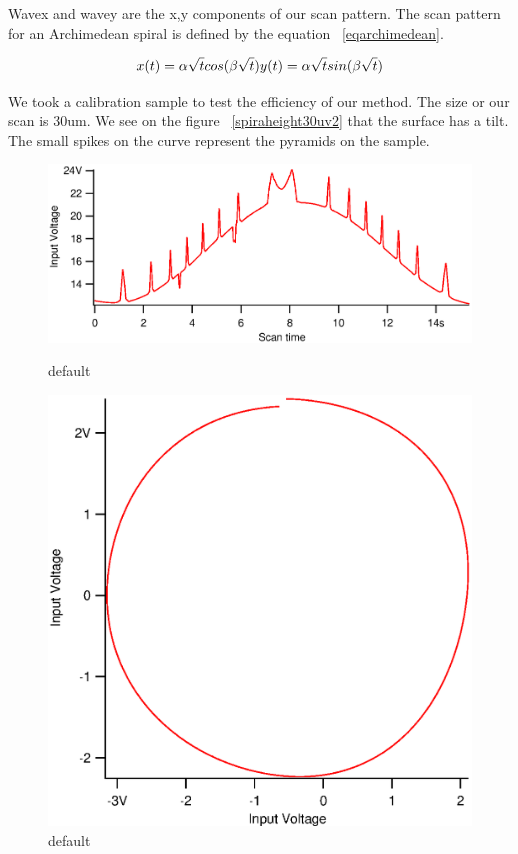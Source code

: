 Wavex and wavey are the x,y components of our scan pattern. The scan pattern for an Archimedean spiral is defined by the equation  ~\ref{eqarchimedean}.

\begin{equation}\label{eqarchimedean}
x(t)= \alpha \sqrt{t} cos(\beta \sqrt{t})\\
y(t)= \alpha \sqrt{t} sin(\beta \sqrt{t})
\end{equation}

We took a calibration sample to test the efficiency of our method. The size or our scan is 30um. We see on the figure  ~\ref{spiraheight30uv2} that the surface has a tilt. The small spikes on the curve represent the pyramids on the sample.

\begin{figure}[ht]
\begin{minipage}[b]{0.45\linewidth}
\centering
\includegraphics[width=\textwidth]{images/spiraheight30uv2.eps}
\caption{default}
\label{spiraheight30uv2}
\end{minipage}
\hspace{0.5cm}
\begin{minipage}[b]{0.45\linewidth}
\centering
\includegraphics[width=\textwidth]{images/xsenvsysen30u.eps}
\caption{default}
\label{xsenvsysen30u}
\end{minipage}
\end{figure}

